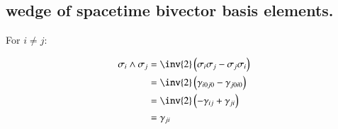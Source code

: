 \documentclass{article}
\begin{document}
\subsection{ wedge of spacetime bivector basis elements. }

For $i \ne j$:

\begin{align*}
\sigma_i \wedge \sigma_j
&= \inv{2}\left( \sigma_i \sigma_j - \sigma_j \sigma_i \right) \\
&= \inv{2}\left( \gamma_{i0j0} - \gamma_{j0i0} \right) \\
&= \inv{2}\left( -\gamma_{ij} +\gamma_{ji} \right) \\
&= \gamma_{ji}
\end{align*}
\end{document}
